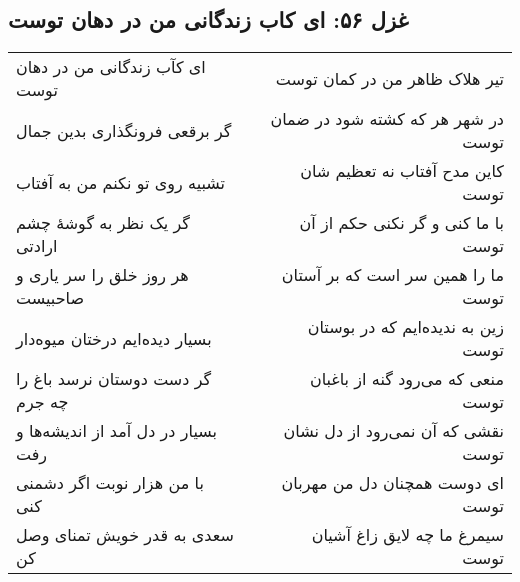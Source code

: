 \begin{center}
\section*{غزل ۵۶: ای کاب زندگانی من در دهان توست}
\label{sec:056}
\begin{longtable}{l p{0.5cm} r}
ای کآب زندگانی من در دهان توست
&&
تیر هلاک ظاهر من در کمان توست
\\
گر برقعی فرونگذاری بدین جمال
&&
در شهر هر که کشته شود در ضمان توست
\\
تشبیه روی تو نکنم من به آفتاب
&&
کاین مدح آفتاب نه تعظیم شان توست
\\
گر یک نظر به گوشهٔ چشم ارادتی
&&
با ما کنی و گر نکنی حکم از آن توست
\\
هر روز خلق را سر یاری و صاحبیست
&&
ما را همین سر است که بر آستان توست
\\
بسیار دیده‌ایم درختان میوه‌دار
&&
زین به ندیده‌ایم که در بوستان توست
\\
گر دست دوستان نرسد باغ را چه جرم
&&
منعی که می‌رود گنه از باغبان توست
\\
بسیار در دل آمد از اندیشه‌ها و رفت
&&
نقشی که آن نمی‌رود از دل نشان توست
\\
با من هزار نوبت اگر دشمنی کنی
&&
ای دوست همچنان دل من مهربان توست
\\
سعدی به قدر خویش تمنای وصل کن
&&
سیمرغ ما چه لایق زاغ آشیان توست
\\
\end{longtable}
\end{center}
